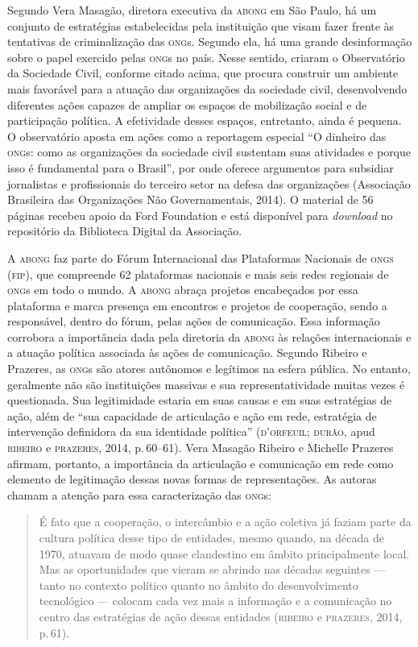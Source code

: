 Segundo Vera Masagão, diretora executiva da \textsc{abong} em São Paulo, há um
conjunto de estratégias estabelecidas pela instituição que visam fazer
frente às tentativas de criminalização das \textsc{ong}s. Segundo ela, há uma
grande desinformação sobre o papel exercido pelas \textsc{ong}s no país. Nesse
sentido, criaram o Observatório da Sociedade Civil, conforme citado
acima, que procura construir um ambiente mais favorável para a atuação
das organizações da sociedade civil, desenvolvendo diferentes ações
capazes de ampliar os espaços de mobilização social e de participação
política. A efetividade desses espaços, entretanto, ainda é pequena. O
observatório aposta em ações como a reportagem especial ``O dinheiro das
\textsc{ong}s: como as organizações da sociedade civil sustentam suas atividades e porque isso é fundamental para o Brasil'', por onde oferece
argumentos para subsidiar jornalistas e profissionais do terceiro setor
na defesa das organizações (Associação Brasileira das Organizações
Não Governamentais, 2014). O material de 56 páginas recebeu apoio da
Ford Foundation e está disponível para \textit{download} no repositório da
Biblioteca Digital da Associação.

A \textsc{abong} faz parte do Fórum Internacional das Plataformas Nacionais
de \textsc{ongs} (\textsc{fip}), que compreende 62 plataformas nacionais e mais seis redes
regionais de \textsc{ong}s em todo o mundo. A \textsc{abong} abraça projetos encabeçados
por essa plataforma e marca presença em encontros e projetos de
cooperação, sendo a responsável, dentro do fórum, pelas ações de
comunicação. Essa informação corrobora a importância dada pela diretoria
da \textsc{abong} às relações internacionais e a atuação política associada às
ações de comunicação. Segundo Ribeiro e Prazeres, as \textsc{ong}s são atores
autônomos e legítimos na esfera pública. No entanto, geralmente não são
instituições massivas e sua representatividade muitas vezes é
questionada. Sua legitimidade estaria em suas causas e em suas
estratégias de ação, além de ``sua capacidade de articulação e ação em
rede, estratégia de intervenção definidora da sua identidade política''
(\textsc{d'orfeuil; durão}, apud \textsc{ribeiro} e \textsc{prazeres}, 2014, p.\,60--61). Vera
Masagão Ribeiro e Michelle Prazeres afirmam, portanto, a importância da
articulação e comunicação em rede como elemento de legitimação dessas
novas formas de representações. As autoras chamam a atenção para essa
caracterização das \textsc{ong}s:

\begin{quote}
É fato que a cooperação, o intercâmbio e a ação coletiva já faziam parte
da cultura política desse tipo de entidades, mesmo quando, na década de
1970, atuavam de modo quase clandestino em âmbito principalmente local.
Mas as oportunidades que vieram se abrindo nas décadas seguintes ---
tanto no contexto político quanto no âmbito do desenvolvimento
tecnológico --- colocam cada vez mais a informação e a comunicação no
centro das estratégias de ação dessas entidades (\textsc{ribeiro} e \textsc{prazeres},
2014, p.\,61).
\end{quote}

